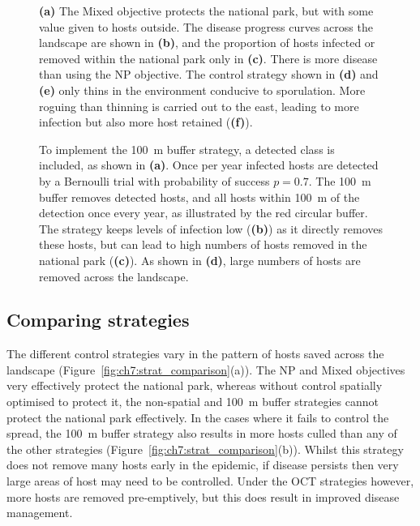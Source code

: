 {\begin{figure}[H]
    \begin{center}
        \caption[Optimal control strategy using the Mixed objective]{\textbf{(a)} The Mixed objective protects the national park, but with some value given to hosts outside. The disease progress curves across the landscape are shown in \textbf{(b)}, and the proportion of hosts infected or removed within the national park only in \textbf{(c)}. There is more disease than using the NP objective. The control strategy shown in \textbf{(d)} and \textbf{(e)} only thins in the environment conducive to sporulation. More roguing than thinning is carried out to the east, leading to more infection but also more host retained (\textbf{(f)}).\label{fig:ch7:ol_mixed}}
    \end{center}
\end{figure}
}

\begin{figure}
    \begin{center}
        \caption[\SI{100}{\meter} buffer zone strategy]{To implement the \SI{100}{\meter} buffer strategy, a detected class is included, as shown in \textbf{(a)}. Once per year infected hosts are detected by a Bernoulli trial with probability of success $p=0.7$. The \SI{100}{\meter} buffer removes detected hosts, and all hosts within \SI{100}{\meter} of the detection once every year, as illustrated by the red circular buffer. The strategy keeps levels of infection low (\textbf{(b)}) as it directly removes these hosts, but can lead to high numbers of hosts removed in the national park (\textbf{(c)}). As shown in \textbf{(d)}, large numbers of hosts are removed across the landscape.\label{fig:ch7:100m_buffer}}
    \end{center}
\end{figure}

\FloatBarrier
\subsection{Comparing strategies}

The different control strategies vary in the pattern of hosts saved across the landscape (Figure~\ref{fig:ch7:strat_comparison}(a)). The NP and Mixed objectives very effectively protect the national park, whereas without control spatially optimised to protect it, the non-spatial and \SI{100}{\meter} buffer strategies cannot protect the national park effectively. In the cases where it fails to control the spread, the \SI{100}{\meter} buffer strategy also results in more hosts culled than any of the other strategies (Figure~\ref{fig:ch7:strat_comparison}(b)). Whilst this strategy does not remove many hosts early in the epidemic, if disease persists then very large areas of host may need to be controlled. Under the OCT strategies however, more hosts are removed pre-emptively, but this does result in improved disease management.


